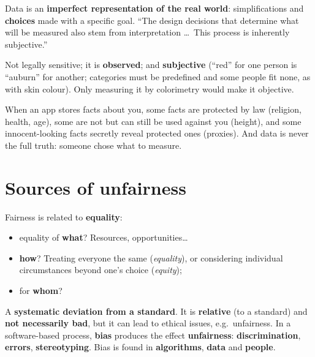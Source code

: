 \documentclass[11pt,a4paper,openany]{book}
\begin{document}
\begin{keybox}[title={Data $\neq$ objectivity (boyd \& Crawford, 2012; Feinberg, 2023)}]
Data is an \textbf{imperfect representation of the real world}: simplifications and
\textbf{choices} made with a specific goal. ``The design decisions that determine what will be
measured also stem from interpretation \ldots\ This process is inherently subjective.''
\end{keybox}

\begin{exbox}[title={Review question: hair colour as an attribute}]
Not legally sensitive; it is \textbf{observed}; and \textbf{subjective} (``red'' for one person
is ``auburn'' for another; categories must be predefined and some people fit none, as with skin
colour). Only measuring it by colorimetry would make it objective.
\end{exbox}

\begin{goatbox}
When an app stores facts about you, some facts are protected by law (religion, health, age),
some are not but can still be used against you (height), and some innocent-looking facts secretly
reveal protected ones (proxies). And data is never the full truth: someone chose what to measure.
\end{goatbox}


\section{Sources of unfairness}

\begin{defnbox}[title={Fairness: three questions (Gosepath, 2021; Binns, 2018)}]
Fairness is related to \textbf{equality}:
\begin{itemize}
  \item equality of \textbf{what}? Resources, opportunities\ldots
  \item \textbf{how}? Treating everyone the same (\emph{equality}), or considering individual
        circumstances beyond one's choice (\emph{equity});
  \item for \textbf{whom}?
\end{itemize}
\end{defnbox}

\begin{defnbox}[title={Bias}]
A \textbf{systematic deviation from a standard}. It is \textbf{relative} (to a standard) and
\textbf{not necessarily bad}, but it can lead to ethical issues, e.g.\ unfairness. In a
software-based process, \textbf{bias} produces the effect \textbf{unfairness}:
\textbf{discrimination}, \textbf{errors}, \textbf{stereotyping}. Bias is found in
\textbf{algorithms}, \textbf{data} and \textbf{people}.
\end{defnbox}
\end{document}
